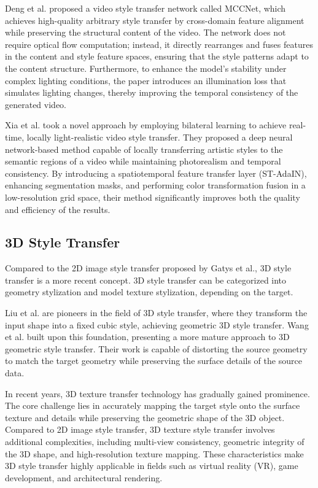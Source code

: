 \documentclass[preprint,12pt]{elsarticle}
\begin{document}
Deng et al.\citep{97deng2021arbitrary} proposed a video style transfer network called MCCNet, which achieves high-quality arbitrary style transfer by cross-domain feature alignment while preserving the structural content of the video. The network does not require optical flow computation; instead, it directly rearranges and fuses features in the content and style feature spaces, ensuring that the style patterns adapt to the content structure. Furthermore, to enhance the model's stability under complex lighting conditions, the paper introduces an illumination loss that simulates lighting changes, thereby improving the temporal consistency of the generated video.

Xia et al.\citep{103xia2021real} took a novel approach by employing bilateral learning to achieve real-time, locally light-realistic video style transfer. They proposed a deep neural network-based method capable of locally transferring artistic styles to the semantic regions of a video while maintaining photorealism and temporal consistency. By introducing a spatiotemporal feature transfer layer (ST-AdaIN), enhancing segmentation masks, and performing color transformation fusion in a low-resolution grid space, their method significantly improves both the quality and efficiency of the results.
\subsection{3D Style Transfer}
Compared to the 2D image style transfer proposed by Gatys et al., 3D style transfer is a more recent concept.\citep{84liu2019cubic} 3D style transfer can be categorized into geometry stylization and model texture stylization, depending on the target.

Liu et al.\citep{84liu2019cubic} are pioneers in the field of 3D style transfer, where they transform the input shape into a fixed cubic style, achieving geometric 3D style transfer. Wang et al.\citep{85yifan2020neural} built upon this foundation, presenting a more mature approach to 3D geometric style transfer. Their work is capable of distorting the source geometry to match the target geometry while preserving the surface details of the source data.

In recent years, 3D texture transfer technology has gradually gained prominence. The core challenge lies in accurately mapping the target style onto the surface texture and details while preserving the geometric shape of the 3D object. Compared to 2D image style transfer, 3D texture style transfer involves additional complexities, including multi-view consistency, geometric integrity of the 3D shape, and high-resolution texture mapping. These characteristics make 3D style transfer highly applicable in fields such as virtual reality (VR), game development, and architectural rendering.
\end{document}
